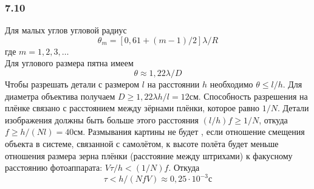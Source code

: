 \subsubsection*{7.10}
Для малых углов угловой радиус
\begin{equation}\label{eq7101}
	\theta_m  = [0,61 + (m - 1)/2] \lambda / R
\end{equation}
где $m = 1, 2, 3, \dots$\\
Для углового размера пятна имеем
\begin{equation}\label{eq7102}
	\theta \approx 1,22 \lambda / D
\end{equation}
Чтобы разрешать детали с размером $l$ на расстоянии $h$ необходимо $\theta \leq l/h$. Для диаметра объектива получаем $D \geq 1,22 \lambda h / l = 12 см$. Способность разрешения на плёнке связано с расстоянием между зёрнами плёнки, которое равно $1/N$. Детали изображения должны быть больше этого расстояния $(l/h) f \geq 1/N$, откуда $f \geq h / (Nl) = 40 см$. Размывания картины не будет , если отношение смещения объекта в системе, связанной с самолётом, к высоте полёта будет меньше отношения размера зерна плёнки (расстояние между штрихами) к факусному расстоянию фотоаппарата: $V \tau / h < (1/N) f$. Откуда
\begin{equation*}
	\tau < h / (N f V) \approx 0,25 \cdot 10^{-3} с
\end{equation*}